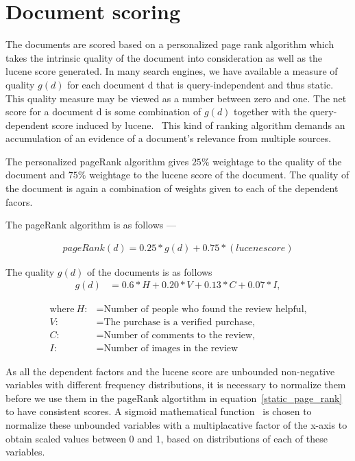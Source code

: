 \documentclass{article}
\begin{document}
\section{Document scoring}

The documents are scored based on a personalized page rank algorithm which takes the intrinsic quality of the document into consideration as well as the lucene score generated. In many search engines, we have available a measure of quality $g(d)$ for each document d that is query-independent and thus static. This quality measure may be viewed as a number between zero and one. The net score for a document d is some combination of $g(d)$ together with the query-dependent score induced by lucene.~\cite{manning2008introduction} This kind of ranking algorithm demands an accumulation of an evidence of a document's relevance from multiple sources. 

The personalized pageRank algorithm gives $25\%$ weightage to the quality of the document and $75\%$ weightage to the lucene score of the document. The quality of the document is again a combination of weights given to each of the dependent facors.  

The pageRank algorithm is as follows ---

\begin{align}
pageRank(d) = 0.25 * g(d) + 0.75 * (lucene score)
\end{align}

The quality $g(d)$ of the documents is as follows 
\begin{align}
  g(d) &= 0.6 * H  + 0.20 * V + 0.13 * C + 0.07 * I,
  \label{static_page_rank}
\end{align}

\begin{align*}
 \text{where}~H: &= \text{Number of people who found the review helpful,} \\
 V: &= \text{The purchase is a verified purchase,} \\
 C: &= \text{Number of comments to the review,} \\
 I: &= \text{Number of images in the review}
\end{align*}

As all the dependent factors and the lucene score are unbounded non-negative variables with different frequency distributions, it is necessary to normalize them before we use them in the pageRank algortithm in equation~\eqref{static_page_rank} to have consistent scores. A sigmoid mathematical function~\cite{wiki:sigmoid_function} is chosen to normalize these unbounded variables with a multiplacative factor of the x-axis to obtain scaled values between 0 and 1, based on distributions of each of these variables. 
\end{document}
